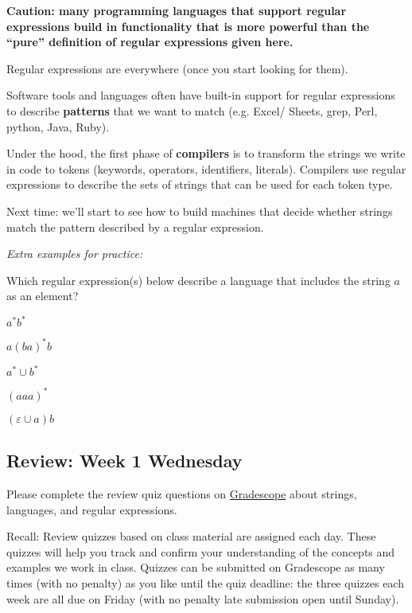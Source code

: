 \documentclass[12pt, oneside]{article}
\begin{document}
\newpage
{\bf Caution: many programming languages that support regular expressions build in functionality
that is more powerful than the ``pure'' definition of regular expressions given here. }

Regular expressions are everywhere (once you start looking for them).

Software tools and languages often have built-in support for regular expressions to describe
{\bf patterns} that we want to match (e.g. Excel/ Sheets, grep, Perl, python, Java, Ruby).

Under the hood, the first phase of {\bf compilers} is to transform the strings we write 
in code to tokens (keywords, operators, identifiers, literals). Compilers use regular expressions
to describe the sets of strings that can be used for each token type.

Next time: we'll start to see how to build machines that decide whether strings match the pattern
described by a regular expression.

\vfill


{\it Extra examples for practice:}

Which regular expression(s) below describe a language that includes the string $a$ as an element?

$a^* b^*$ 

\vfill

$a(ba)^* b$

\vfill

$a^* \cup b^*$

\vfill

$(aaa)^*$

\vfill

$(\varepsilon \cup a) b$

\vfill 
\newpage
\subsection*{Review: Week 1 Wednesday}

Please complete the review quiz questions on \href{http://gradescope.com}{Gradescope} about 
strings, languages, and regular expressions.


Recall: Review quizzes based on class material are assigned each day. 
These quizzes will help you track and confirm your understanding of the concepts and examples 
we work in class. Quizzes can be submitted on Gradescope as many times (with no penalty) as 
you like until the quiz deadline: the three quizzes each week are all due on Friday (with no penalty 
late submission open until Sunday).
\end{document}
